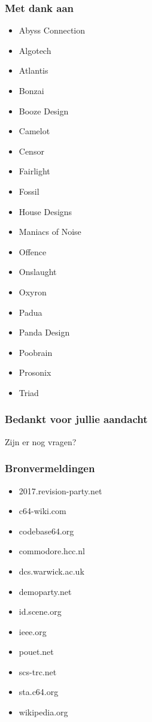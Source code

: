 \documentclass[aspectratio=43]{uva-inf-presentation}
\begin{document}
\begin{frame}
\frametitle{Met dank aan}

\begin{multicols}{2}
\begin{itemize}
\item Abyss Connection
\item Algotech
\item Atlantis
\item Bonzai
\item Booze Design
\item Camelot
\item Censor
\item Fairlight
\item Fossil
\item House Designs
\item Maniacs of Noise
\item Offence
\item Onslaught
\item Oxyron
\item Padua
\item Panda Design
\item Poobrain
\item Prosonix
\item Triad
\end{itemize}
\end{multicols}

\end{frame}


\begin{frame}
\frametitle{Bedankt voor jullie aandacht}
\Large{\centerline{Zijn er nog vragen?}}
\end{frame}


\begin{frame}
\frametitle{Bronvermeldingen}

\begin{multicols}{2}
\begin{itemize}
\item 2017.revision-party.net
\item c64-wiki.com
\item codebase64.org
\item commodore.hcc.nl
\item dcs.warwick.ac.uk
\item demoparty.net
\item id.scene.org
\item ieee.org
\item pouet.net
\item scs-trc.net
\item sta.c64.org
\item wikipedia.org
\end{itemize}
\end{multicols}

\end{frame}
\end{document}
